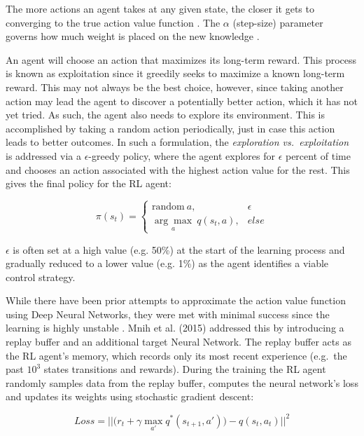 The more actions an agent takes at any given state, the closer it gets to converging to the true action value function \cite{Sutton98}.
The $\alpha$ (step-size) parameter governs how much weight is placed on the new knowledge \cite{Sutton98}.

An agent will choose an action that maximizes its long-term reward.
This process is known as exploitation since it greedily seeks to maximize a known long-term reward.
This may not always be the best choice, however, since taking another action may lead the agent to discover a potentially better action, which it has not yet tried.
As such, the agent also needs to explore its environment.
This is accomplished by taking a random action periodically, just in case this action leads to better outcomes.
In such a formulation, the \textit{exploration vs.\ exploitation} is addressed via a $\epsilon$-greedy policy, where the agent explores for $\epsilon$ percent of time and chooses an action associated with the highest action value for the rest.
This gives the final policy for the RL agent:

\begin{equation}
    \pi(s_t) = \begin{cases}
    \text{random} \  a, & \epsilon  \\
    \underset{a}{\arg\max} \ q(s_t,a), & else
    \end{cases}
\end{equation}

$\epsilon$ is often set at a high value (e.g. 50\%) at the start of the learning process and gradually reduced to a lower value (e.g. 1\%) as the agent identifies a viable control strategy.

While there have been prior attempts to approximate the action value function using Deep Neural Networks, they were met with minimal success since the learning is highly unstable \cite{Mnih2015}.
Mnih et al. (2015) \cite{Mnih2015} addressed this by introducing a replay buffer and an additional target Neural Network.
The replay buffer acts as the RL agent’s memory, which records only its most recent experience (e.g.\ the past $10^3$ states transitions and rewards).
During the training the RL agent randomly samples data from the replay buffer, computes the neural network’s loss and updates its weights using stochastic gradient descent:


\begin{equation}
    Loss = ||\big( r_t + \gamma \max_{a'} q^* (s_{t+1},a')\big) - q(s_t,a_t) ||^2
\end{equation}

